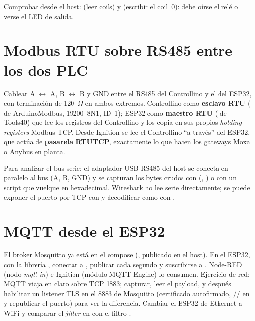 Comprobar desde el host:  (leer coils) y  (escribir el coil~0): debe oírse el relé o verse el LED de salida.

\section{Modbus RTU sobre RS485 entre los dos PLC}
\label{sec:rtu}

Cablear A $\leftrightarrow$ A, B $\leftrightarrow$ B y GND entre el RS485 del Controllino y el del ESP32, con terminación de 120~$\Omega$ en ambos extremos. Controllino como \textbf{esclavo RTU} ( de ArduinoModbus, 19200~8N1, ID~1); ESP32 como \textbf{maestro RTU} ( de Tools40) que lee los registros del Controllino y los copia en sus propios \emph{holding registers} Modbus TCP. Desde Ignition se lee el Controllino ``a través'' del ESP32, que actúa de \textbf{pasarela RTU\ra{}TCP}, exactamente lo que hacen los gateways Moxa o Anybus en planta.

Para analizar el bus serie: el adaptador USB-RS485 del host se conecta en paralelo al bus (A, B, GND) y se capturan los bytes crudos con  (, ) o con un script que vuelque  en hexadecimal. Wireshark no lee serie directamente; se puede exponer el puerto por TCP con  y decodificar como  con .

\section{MQTT desde el ESP32}
\label{sec:mqtt-esp32}

El broker Mosquitto ya está en el compose (, publicado en el host). En el ESP32, con la librería , conectar a , publicar cada segundo  y suscribirse a . Node-RED (nodo \emph{mqtt in}) e Ignition (módulo MQTT Engine) lo consumen. Ejercicio de red: MQTT viaja en claro sobre TCP 1883; capturar, leer el payload, y después habilitar un listener TLS en el 8883 de Mosquitto (certificado autofirmado, // en  y republicar el puerto) para ver la diferencia. Cambiar el ESP32 de Ethernet a WiFi y comparar el \emph{jitter} en  con el filtro .
